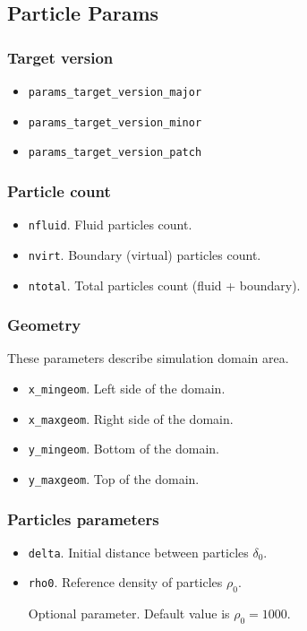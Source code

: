 \subsection{Particle Params}

\subsubsection{Target version}

\begin{itemize}
    \item \verb|params_target_version_major|
    \item \verb|params_target_version_minor|
    \item \verb|params_target_version_patch|
\end{itemize}

\subsubsection{Particle count}

\begin{itemize}
    \item \verb|nfluid|. Fluid particles count.
    \item \verb|nvirt|. Boundary (virtual) particles count.
    \item \verb|ntotal|. Total particles count (fluid + boundary).
\end{itemize}

\subsubsection{Geometry}
These parameters describe simulation domain area.

\begin{itemize}
    \item \verb|x_mingeom|. Left side of the domain.
    \item \verb|x_maxgeom|. Right side of the domain.
    \item \verb|y_mingeom|. Bottom of the domain.
    \item \verb|y_maxgeom|. Top of the domain.
\end{itemize}

\subsubsection{Particles parameters}

\begin{itemize}
    \item \verb|delta|. Initial distance between particles $\delta_{0}$.
    \item \verb|rho0|. Reference density of particles $\rho_{0}$.
    
    Optional parameter. Default value is $\rho_{0} = 1000$.
\end{itemize}

